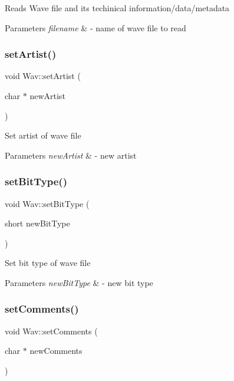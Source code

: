 Reads Wave file and its techinical information/data/metadata 
\begin{DoxyParams}{Parameters}
{\em filename} & -\/ name of wave file to read \\
\hline
\end{DoxyParams}
\mbox{\label{classWav_a9f8d3ea3c801962ac79b328318c95ac2}} 
\subsubsection{\texorpdfstring{set\+Artist()}{setArtist()}}
{\footnotesize\ttfamily void Wav\+::set\+Artist (\begin{DoxyParamCaption}\item[{char $\ast$}]{new\+Artist }\end{DoxyParamCaption})}

Set artist of wave file 
\begin{DoxyParams}{Parameters}
{\em new\+Artist} & -\/ new artist \\
\hline
\end{DoxyParams}
\mbox{\label{classWav_a4ba91ed72a52ae6164bef1ba0ce5c548}} 
\subsubsection{\texorpdfstring{set\+Bit\+Type()}{setBitType()}}
{\footnotesize\ttfamily void Wav\+::set\+Bit\+Type (\begin{DoxyParamCaption}\item[{short}]{new\+Bit\+Type }\end{DoxyParamCaption})}

Set bit type of wave file 
\begin{DoxyParams}{Parameters}
{\em new\+Bit\+Type} & -\/ new bit type \\
\hline
\end{DoxyParams}
\mbox{\label{classWav_af2ddf6c128bb91c23d124a33a2ea627f}} 
\subsubsection{\texorpdfstring{set\+Comments()}{setComments()}}
{\footnotesize\ttfamily void Wav\+::set\+Comments (\begin{DoxyParamCaption}\item[{char $\ast$}]{new\+Comments }\end{DoxyParamCaption})}

